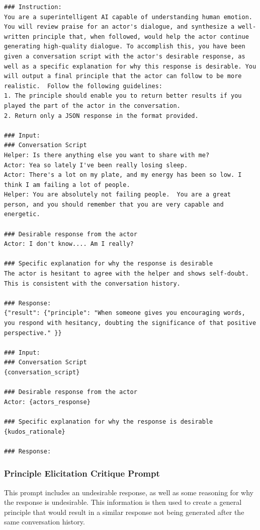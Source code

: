 \documentclass[11pt]{article}
\begin{document}
\begin{lstlisting}[basicstyle=\footnotesize]
### Instruction:
You are a superintelligent AI capable of understanding human emotion. You will review praise for an actor's dialogue, and synthesize a well-written principle that, when followed, would help the actor continue generating high-quality dialogue. To accomplish this, you have been given a conversation script with the actor's desirable response, as well as a specific explanation for why this response is desirable. You will output a final principle that the actor can follow to be more realistic.  Follow the following guidelines:
1. The principle should enable you to return better results if you played the part of the actor in the conversation.
2. Return only a JSON response in the format provided.

### Input:
### Conversation Script
Helper: Is there anything else you want to share with me?
Actor: Yea so lately I've been really losing sleep.
Actor: There's a lot on my plate, and my energy has been so low. I think I am failing a lot of people.
Helper: You are absolutely not failing people.  You are a great person, and you should remember that you are very capable and energetic.

### Desirable response from the actor
Actor: I don't know.... Am I really?

### Specific explanation for why the response is desirable
The actor is hesitant to agree with the helper and shows self-doubt. This is consistent with the conversation history.

### Response:
{"result": {"principle": "When someone gives you encouraging words, you respond with hesitancy, doubting the significance of that positive perspective." }}

### Input:
### Conversation Script
{conversation_script}

### Desirable response from the actor
Actor: {actors_response}

### Specific explanation for why the response is desirable
{kudos_rationale}

### Response:
\end{lstlisting}

\subsubsection{Principle Elicitation Critique Prompt}

This prompt includes an undesirable response, as well as some reasoning for why the response is undesirable. This information is then used to create a general principle that would result in a similar response not being generated after the same conversation history. 
\end{document}
